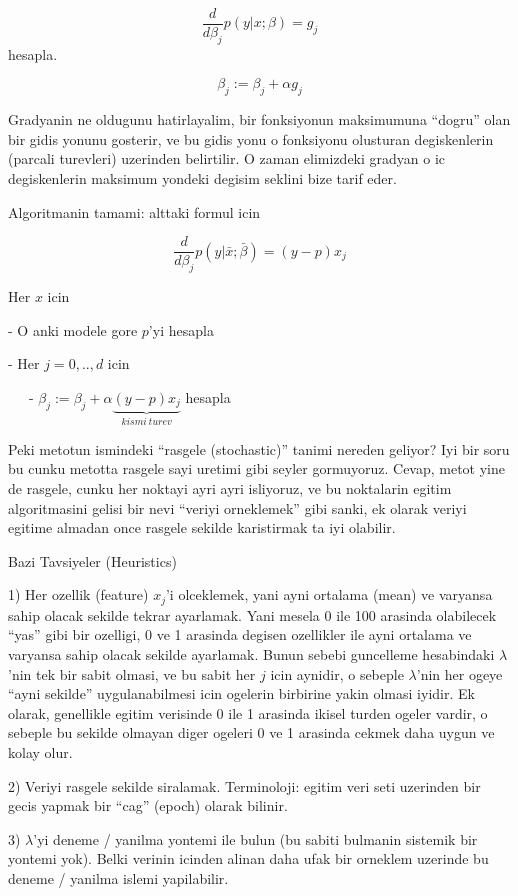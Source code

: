 \documentclass[12pt,fleqn]{article}\usepackage{../common}
\begin{document}
$$ \frac{d}{d\beta_j}p(y|x;\beta) = g_j$$ hesapla. 

$$ \beta_j := \beta_j + \alpha g_j $$

Gradyanin ne oldugunu hatirlayalim, bir fonksiyonun maksimumuna ``dogru''
olan bir gidis yonunu gosterir, ve bu gidis yonu o fonksiyonu olusturan
degiskenlerin (parcali turevleri) uzerinden belirtilir. O zaman elimizdeki
gradyan o ic degiskenlerin maksimum yondeki degisim seklini bize tarif
eder. 

Algoritmanin tamami: alttaki formul icin

$$ \frac{d}{d\beta_j}p(y|\bar{x};\bar{\beta}) = (y-p)x_j $$

Her $x$ icin

- O anki modele gore $p$'yi hesapla

- Her $j = 0,..,d$ icin

\ \ \ - $ \beta_j := \beta_j + \alpha \underbrace{ (y-p) x_j}_{kismi \ turev} $ hesapla
  
Peki metotun ismindeki ``rasgele (stochastic)'' tanimi nereden geliyor? Iyi
bir soru bu cunku metotta rasgele sayi uretimi gibi seyler
gormuyoruz. Cevap, metot yine de rasgele, cunku her noktayi ayri ayri
isliyoruz, ve bu noktalarin egitim algoritmasini gelisi bir nevi ``veriyi
orneklemek'' gibi sanki, ek olarak veriyi egitime almadan once rasgele
sekilde karistirmak ta iyi olabilir. 

Bazi Tavsiyeler (Heuristics)

1) Her ozellik (feature) $x_j$'i olceklemek, yani ayni ortalama (mean) ve
varyansa sahip olacak sekilde tekrar ayarlamak. Yani mesela 0 ile 100
arasinda olabilecek ``yas'' gibi bir ozelligi, 0 ve 1 arasinda degisen
ozellikler ile ayni ortalama ve varyansa sahip olacak sekilde
ayarlamak. Bunun sebebi guncelleme hesabindaki $\lambda$'nin tek bir sabit
olmasi, ve bu sabit her $j$ icin aynidir, o sebeple $\lambda$'nin her ogeye
``ayni sekilde'' uygulanabilmesi icin ogelerin birbirine yakin olmasi
iyidir. Ek olarak, genellikle egitim verisinde 0 ile 1 arasinda ikisel
turden ogeler vardir, o sebeple bu sekilde olmayan diger ogeleri 0 ve 1
arasinda cekmek daha uygun ve kolay olur.

2) Veriyi rasgele sekilde siralamak. Terminoloji: egitim veri seti
uzerinden bir gecis yapmak bir ``cag'' (epoch) olarak bilinir. 

3) $\lambda$'yi deneme / yanilma yontemi ile bulun (bu sabiti bulmanin
sistemik bir yontemi yok). Belki verinin icinden alinan daha ufak bir
orneklem uzerinde bu deneme / yanilma islemi yapilabilir.
\end{document}
